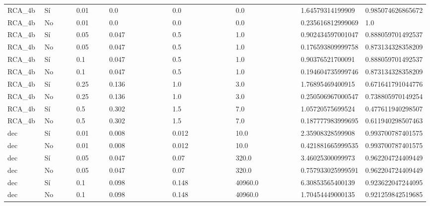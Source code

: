 {{\begin{longtable}{M{0.09\linewidth}M{0.09\linewidth}M{0.09\linewidth}M{0.09\linewidth}M{0.09\linewidth}M{0.09\linewidth}M{0.09\linewidth}M{0.09\linewidth}M{0.09\linewidth}M{0.09\linewidth}M{0.09\linewidth}}
RCA\_4b & Sí & \num{0.01} & \num{0.0} &   & \num{0.0} &   & \num{0.0} &   & \num{1.64579314199909} & \num{0.985074626865672} \\
RCA\_4b & No & \num{0.01} & \num{0.0} &   & \num{0.0} &   & \num{0.0} &   & \num{0.235616812999069} & \num{1.0} \\
RCA\_4b & Sí & \num{0.05} & \num{0.047} &   & \num{0.5} &   & \num{1.0} &   & \num{0.902434597001047} & \num{0.888059701492537} \\
RCA\_4b & No & \num{0.05} & \num{0.047} &   & \num{0.5} &   & \num{1.0} &   & \num{0.176593809999758} & \num{0.873134328358209} \\
RCA\_4b & Sí & \num{0.1} & \num{0.047} &   & \num{0.5} &   & \num{1.0} &   & \num{0.90376521700091} & \num{0.888059701492537} \\
RCA\_4b & No & \num{0.1} & \num{0.047} &   & \num{0.5} &   & \num{1.0} &   & \num{0.194604735999746} & \num{0.873134328358209} \\
RCA\_4b & Sí & \num{0.25} & \num{0.136} &   & \num{1.0} &   & \num{3.0} &   & \num{1.76895469400915} & \num{0.671641791044776} \\
RCA\_4b & No & \num{0.25} & \num{0.136} &   & \num{1.0} &   & \num{3.0} &   & \num{0.250506967000547} & \num{0.738805970149254} \\
RCA\_4b & Sí & \num{0.5} & \num{0.302} &   & \num{1.5} &   & \num{7.0} &   & \num{1.05720575699524} & \num{0.477611940298507} \\
RCA\_4b & No & \num{0.5} & \num{0.302} &   & \num{1.5} &   & \num{7.0} &   & \num{0.187777983999695} & \num{0.611940298507463} \\
dec & Sí & \num{0.01} & \num{0.008} &   & \num{0.012} &   & \num{10.0} &   & \num{2.35908328599908} & \num{0.993700787401575} \\
dec & No & \num{0.01} & \num{0.008} &   & \num{0.012} &   & \num{10.0} &   & \num{0.421881665999535} & \num{0.993700787401575} \\
dec & Sí & \num{0.05} & \num{0.047} &   & \num{0.07} &   & \num{320.0} &   & \num{3.46025300099973} & \num{0.962204724409449} \\
dec & No & \num{0.05} & \num{0.047} &   & \num{0.07} &   & \num{320.0} &   & \num{0.757933025999591} & \num{0.962204724409449} \\
dec & Sí & \num{0.1} & \num{0.098} &   & \num{0.148} &   & \num{40960.0} &   & \num{6.30853565400139} & \num{0.923622047244095} \\
dec & No & \num{0.1} & \num{0.098} &   & \num{0.148} &   & \num{40960.0} &   & \num{1.70454449000135} & \num{0.921259842519685} \\

\end{longtable}}}
